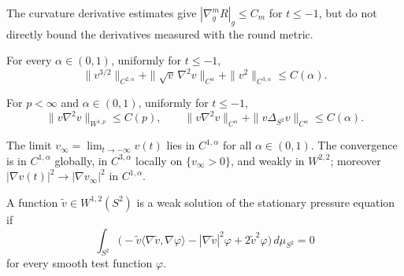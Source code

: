 \begin{remark}
\label{rem:chow-iv-intrinsic-curvature-derivatives}
The curvature derivative estimates give
\(|\nabla_g^mR|_g\le C_m\) for \(t\le-1\), but do not directly bound the
derivatives measured with the round metric.
\end{remark}

\begin{lemma}
\label{lem:chow-iv-weighted-higher-pressure-estimates}
For every \(\alpha\in(0,1)\), uniformly for \(t\le-1\),
\[
 \|v^{3/2}\|_{C^{2,\alpha}}+
 \|\sqrt v\,\nabla^2v\|_{C^\alpha}+
 \|v^2\|_{C^{3,\alpha}}\le C(\alpha).
\]
\end{lemma}

\begin{lemma}
\label{lem:chow-iv-weighted-pressure-hessian}
For \(p<\infty\) and \(\alpha\in(0,1)\), uniformly for \(t\le-1\),
\[
 \|v\nabla^2v\|_{W^{1,p}}\le C(p),\qquad
 \|v\nabla^2v\|_{C^\alpha}+\|v\Delta_{S^2}v\|_{C^\alpha}\le C(\alpha).
\]
\end{lemma}

\begin{lemma}
\label{lem:chow-iv-backward-pressure-convergence}
The limit \(v_\infty=\lim_{t\to-\infty}v(t)\) lies in
\(C^{1,\alpha}\) for all \(\alpha\in(0,1)\).  The convergence is in
\(C^{1,\alpha}\) globally, in \(C^{3,\alpha}\) locally on
\(\{v_\infty>0\}\), and weakly in \(W^{2,2}\); moreover
\(|\nabla v(t)|^2\to|\nabla v_\infty|^2\) in \(C^{1,\alpha}\).
\end{lemma}

\begin{definition}
\label{def:chow-iv-weak-stationary-pressure}
A function \(\widetilde v\in W^{1,2}(S^2)\) is a weak solution of the
stationary pressure equation if
\[
 \int_{S^2}\bigl(-\widetilde v\langle\nabla\widetilde v,\nabla\varphi\rangle
 -|\nabla\widetilde v|^2\varphi+2\widetilde v^2\varphi\bigr)
 \,d\mu_{S^2}=0
\]
for every smooth test function \(\varphi\).
\end{definition}

